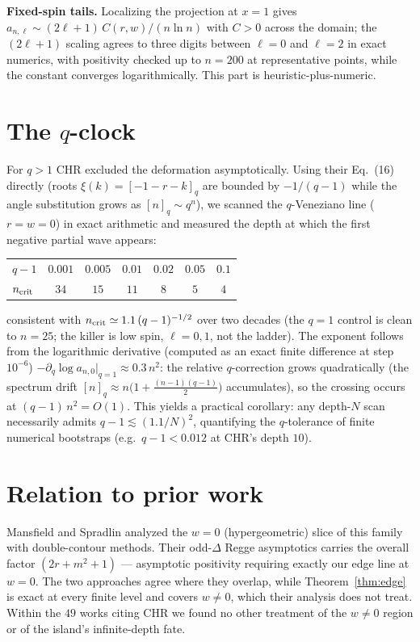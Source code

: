 \documentclass[11pt]{article}
\begin{document}
\textbf{Fixed-spin tails.} Localizing the projection at $x=1$ gives
$a_{n,\ell}\sim (2\ell+1)\,C(r,w)/(n\ln n)$ with $C>0$ across the domain; the
$(2\ell+1)$ scaling agrees to three digits between $\ell=0$ and $\ell=2$ in
exact numerics, with positivity checked up to $n=200$ at representative points,
while the constant converges logarithmically. This part is heuristic-plus-numeric.

\section{The $q$-clock}

For $q>1$ CHR excluded the deformation asymptotically. Using their Eq.~(16)
directly (roots $\xi(k)=[-1-r-k]_q$ are bounded by $-1/(q-1)$ while the angle
substitution grows as $[n]_q\sim q^n$), we scanned the $q$-Veneziano line
($r=w=0$) in exact arithmetic and measured the depth at which the first
negative partial wave appears:
\begin{center}
\begin{tabular}{lcccccc}
\toprule
$q-1$ & $0.001$ & $0.005$ & $0.01$ & $0.02$ & $0.05$ & $0.1$\\
$n_{\rm crit}$ & $34$ & $15$ & $11$ & $8$ & $5$ & $4$\\
\bottomrule
\end{tabular}
\end{center}
consistent with $n_{\rm crit}\simeq 1.1\,(q-1)^{-1/2}$ over two decades (the
$q=1$ control is clean to $n=25$; the killer is low spin, $\ell=0,1$, not the
ladder). The exponent follows from the logarithmic derivative (computed as an exact
finite difference at step $10^{-6}$)
$-\partial_q \log a_{n,0}\big|_{q=1}\approx 0.3\,n^2$: the relative
$q$-correction grows quadratically (the spectrum drift $[n]_q\approx
n\bigl(1+\tfrac{(n-1)(q-1)}{2}\bigr)$ accumulates), so the crossing occurs at
$(q-1)\,n^2=O(1)$. This yields a practical corollary: any depth-$N$ scan
necessarily admits $q-1\lesssim (1.1/N)^2$, quantifying the $q$-tolerance of
finite numerical bootstraps (e.g.\ $q-1<0.012$ at CHR's depth $10$).

\section{Relation to prior work}

Mansfield and Spradlin \cite{MS2024} analyzed the $w=0$ (hypergeometric)
slice of this family with double-contour methods. Their odd-$\Delta$ Regge
asymptotics carries the overall factor $(2r+m^2+1)$ --- asymptotic positivity
requiring exactly our edge line at $w=0$. The two approaches agree where they
overlap, while Theorem~\ref{thm:edge} is exact at every finite level and
covers $w\neq 0$, which their analysis does not treat. Within the $49$ works
citing CHR we found no other treatment of the $w\neq 0$ region or of the
island's infinite-depth fate.
\end{document}
